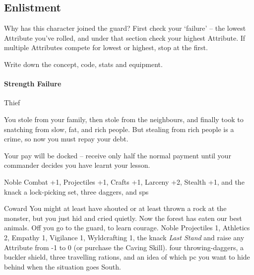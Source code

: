 \begin{multicols}{2}

\subsection{Enlistment}
\label{enlistment}

Why has this character joined the \gls{guard}?
First check your `failure' -- the lowest Attribute you've rolled, and under that section check your highest Attribute.
If multiple Attributes compete for lowest or highest, stop at the first.

Write down the concept, code, stats and equipment.

\begin{figure*}[b!]
  \label{commonWeapons}
  \commonWeaponsChart %
  \commonArmourChart
\end{figure*}

\paragraph{Strength Failure}

\begin{itemize}

    {Thief}%
    {
      You stole from your family, then stole from the neighbours, and finally took to snatching from slow, fat, and rich people.
      But stealing from rich people is a crime, so now you must repay your debt.

      Your pay will be docked -- receive only half the normal payment until your commander decides you have learnt your lesson.

    }%
    {Noble}%
    {Combat +1, Projectiles +1, Crafts +1, Larceny +2, Stealth +1, and the knack }%
    {a lock-picking set, three daggers, and  \glspl{sp}}%

    {Coward}%
    {
      You might at least have shouted or at least thrown a rock at the monster, but you just hid and cried quietly.
      Now the forest has eaten our best animals.
      Off you go to the \gls{guard}, to learn courage.
    }%
    {Noble}%
    {
      Projectiles 1, Athletics 2, Empathy 1, Vigilance 1, Wyldcrafting 1, the knack \textit{Last Stand} and raise any Attribute from -1 to 0 (or purchase the Caving Skill).
    }%
    {
      four throwing-daggers, a buckler shield, three travelling rations, and an idea of which \gls{pc} you want to hide behind when the situation goes South.
    }%



\end{itemize}
\end{multicols}
